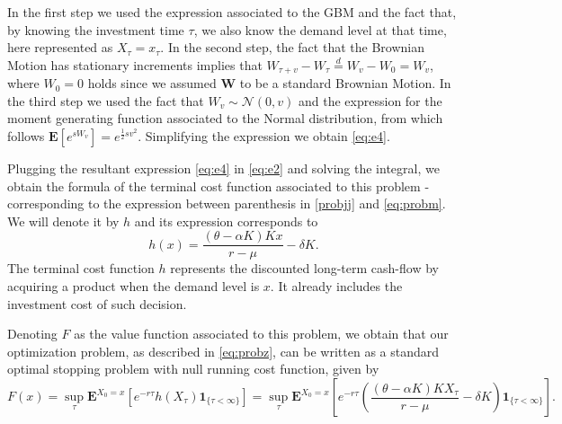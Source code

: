 In the first step we used the expression associated to the GBM and the fact that, by knowing the investment time $\tau$, we also know the demand level at that time, here represented as $X_\tau=x_\tau$. In the second step, the fact that the Brownian Motion has stationary increments implies that $W_{\tau+v}-W_\tau \overset{d}{=} W_v -W_0 = W_v$, where $W_0=0$ holds since we assumed \textbf{W} to be a standard Brownian Motion.
In the third step we used the fact that $ W_v \sim \mathcal{N}(0,v)$ and the expression for the moment generating function associated to the Normal distribution, from which follows $\textbf{E}\left[e^{sW_v}\right]=e^{\frac{1}{2} s v^2}$. Simplifying the expression we obtain \eqref{eq:e4}.

Plugging the resultant expression \eqref{eq:e4} in \eqref{eq:e2} and solving the integral, we obtain the formula of the terminal cost function associated to this problem - corresponding to the expression between parenthesis in \eqref{probjj} and \eqref{eq:probm}. We will denote it by $h$ and its expression corresponds to
\begin{equation}
h(x)=\frac{(\theta-\alpha K)K x}{r-\mu}- \delta K.
\label{prob1:h}
\end{equation}
The terminal cost function $h$ represents the discounted long-term cash-flow by acquiring a product when the demand level is $x$. It already includes the investment cost of such decision.
 
Denoting $F$ as the value function associated to this problem, we obtain that our optimization problem, as described in \eqref{eq:probz}, can be written as a standard optimal stopping problem with null running cost function, given by
\begin{equation}
F(x)=\sup_\tau \textbf{E}^{X_0=x}\left[e^{-r\tau } h(X_\tau) \textbf{1}_{\{\tau<\infty\}} \right]=\sup_\tau \textbf{E}^{X_0=x}\left[e^{-r\tau } \left( \frac{(\theta-\alpha K)K X_\tau}{r-\mu}-\delta K \right) \textbf{1}_{\{\tau<\infty\}} \right].
\label{eq:prob3}
\end{equation}



